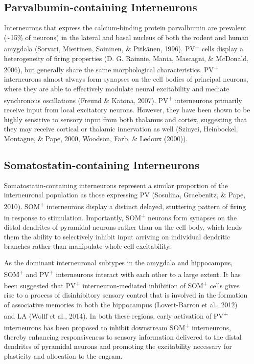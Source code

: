 \documentclass[12pt,a4paperpaper,]{report}
\begin{document}
\subsection{Parvalbumin-containing
Interneurons}\label{parvalbumin-containing-interneurons}

Interneurons that express the calcium-binding protein parvalbumin are
prevalent (\textasciitilde{}15\% of neurons) in the lateral and basal
nucleus of both the rodent and human amygdala (Sorvari, Miettinen,
Soininen, \& Pitkänen, 1996). PV\textsuperscript{+} cells display a
heterogeneity of firing properties (D. G. Rainnie, Mania, Mascagni, \&
McDonald, 2006), but generally share the same morphological
characteristics. PV\textsuperscript{+} interneurons almost always form
synapses on the cell bodies of principal neurons, where they are able to
effectively modulate neural excitability and mediate synchronous
oscillations (Freund \& Katona, 2007). PV\textsuperscript{+}
interneurons primarily receive input from local excitatory neurons.
However, they have been shown to be highly sensitive to sensory input
from both thalamus and cortex, suggesting that they may receive cortical
or thalamic innervation as well (Szinyei, Heinbockel, Montagne, \& Pape,
2000, Woodson, Farb, \& Ledoux (2000)).

\subsection{Somatostatin-containing
Interneurons}\label{somatostatin-containing-interneurons}

Somatostatin-containing interneurons represent a similar proportion of
the interneuronal population as those expressing PV (Sosulina,
Graebenitz, \& Pape, 2010). SOM\textsuperscript{+} interneurons display
a distinct delayed, stuttering pattern of firing in response to
stimulation. Importantly, SOM\textsuperscript{+} neurons form synapses
on the distal dendrites of pyramidal neurons rather than on the cell
body, which lends them the ability to selectively inhibit input arriving
on individual dendritic branches rather than manipulate whole-cell
excitability.

As the dominant interneuronal subtypes in the amygdala and hippocampus,
SOM\textsuperscript{+} and PV\textsuperscript{+} interneurons interact
with each other to a large extent. It has been suggested that
PV\textsuperscript{+} interneuron-mediated inhibition of
SOM\textsuperscript{+} cells gives rise to a process of disinhibitory
sensory control that is involved in the formation of associative
memories in both the hippocampus (Lovett-Barron et al., 2012) and LA
(Wolff et al., 2014). In both these regions, early activation of
PV\textsuperscript{+} interneurons has been proposed to inhibit
downstream SOM\textsuperscript{+} interneurons, thereby enhancing
responsiveness to sensory information delivered to the distal dendrites
of pyramidal neurons and promoting the excitability necessary for
plasticity and allocation to the engram.
\end{document}
